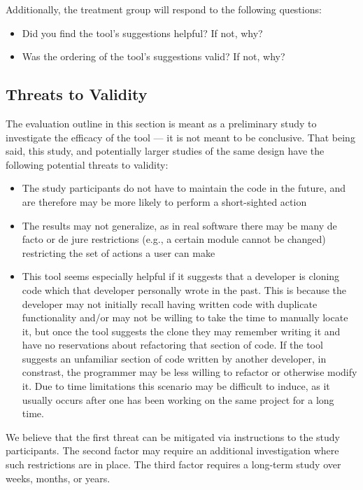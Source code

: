 \documentclass[preprint,10pt]{sigplanconf}
\begin{document}
\noindent Additionally, the treatment group will respond to the following
questions:

\begin{itemize}
  \item Did you find the tool's suggestions helpful? If not, why?
  \item Was the ordering of the tool's suggestions valid? If not, why?
\end{itemize}

\subsection{Threats to Validity}
The evaluation outline in this section is meant as a preliminary study
to investigate the efficacy of the tool --- it is not meant to be
conclusive. That being said, this study, and potentially larger
studies of the same design have the following potential threats to
validity:

\begin{itemize}
  \item The study participants do not have to maintain the code in the
    future, and are therefore may be more likely to perform a
    short-sighted action
  \item The results may not generalize, as in real software there may
    be many de facto or de jure restrictions (e.g., a certain module cannot
    be changed) restricting the set of actions a user can make
  \item This tool seems especially helpful if it suggests that a
    developer is cloning code which that developer personally wrote in the
    past.  This is because the developer may not initially recall having written 
code with duplicate functionality and/or may not be willing to take the time to manually locate it,
but once the tool suggests the clone they may remember writing it and have no reservations about refactoring that section of code.
	If the tool suggests an unfamiliar section of code written by another developer, in constrast, the programmer may be less willing to refactor or otherwise modify it.
	Due to time limitations this scenario may be difficult to
    induce, as it usually occurs after one has been working on the
    same project for a long time.
\end{itemize}

We believe that the first threat can be mitigated via instructions to
the study participants. The second factor may require an additional
investigation where such restrictions are in place.  The third factor
requires a long-term study over weeks, months, or years.
\end{document}
